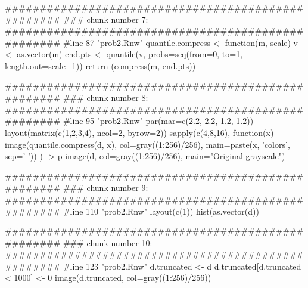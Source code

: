 ###################################################
### chunk number 7: 
###################################################
#line 87 "prob2.Rnw"
quantile.compress <- function(m, scale){
    v <- as.vector(m)
    end.pts <- quantile(v, probs=seq(from=0, to=1, length.out=scale+1))
    return (compress(m, end.pts))
}


###################################################
### chunk number 8: 
###################################################
#line 95 "prob2.Rnw"
par(mar=c(2.2, 2.2, 1.2, 1.2))
layout(matrix(c(1,2,3,4), ncol=2, byrow=2))
sapply(c(4,8,16), 
    function(x){ 
        image(quantile.compress(d, x),
        col=gray((1:256)/256),
        main=paste(x, 'colors', sep=' '))
    }) -> p
image(d, col=gray((1:256)/256), main="Original grayscale")


###################################################
### chunk number 9: 
###################################################
#line 110 "prob2.Rnw"
layout(c(1))
hist(as.vector(d))


###################################################
### chunk number 10: 
###################################################
#line 123 "prob2.Rnw"
d.truncated <- d
d.truncated[d.truncated < 1000] <- 0
image(d.truncated, col=gray((1:256)/256))


